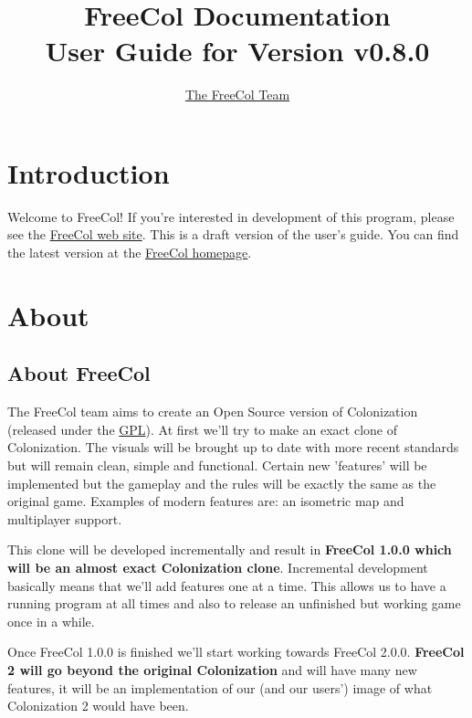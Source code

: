 \documentclass[12pt]{article}
\begin{document}
\author{\href{http://freecol.sourceforge.net/index.php?section=8}{The FreeCol Team}}
\title{FreeCol Documentation\\User Guide for Version v0.8.0}
\maketitle{}

\tableofcontents
\newpage


\hypertarget{Introduction}{\section{Introduction}}

Welcome to FreeCol! If you're interested in development of this
program, please see the \href{http://freecol.sourceforge.net}{FreeCol
web site}. This is a draft version of the user's guide. You can find
the latest version at the
\href{http://freecol.sourceforge.net}{FreeCol homepage}.


\hypertarget{About}{\section{About}}

\hypertarget{About FreeCol}{\subsection{About FreeCol}}

The FreeCol team aims to create an Open Source version of
Colonization (released under the
\href{http://www.gnu.org/licenses/gpl.html}{GPL}). At
first we'll try to make an exact clone of Colonization. The visuals
will be brought up to date with more recent standards but will remain
clean, simple and functional. Certain new 'features' will be
implemented but the gameplay and the rules will be exactly the same as
the original game. Examples of modern features are: an isometric map
and multiplayer support.

This clone will be developed incrementally and result in
\textbf{FreeCol 1.0.0 which will be an almost exact Colonization
clone}. Incremental development basically means that we'll add
features one at a time. This allows us to have a running program at
all times and also to release an unfinished but working game once in a
while.

Once FreeCol 1.0.0 is finished we'll start working towards FreeCol
2.0.0. \textbf{FreeCol 2 will go beyond the original Colonization} and
will have many new features, it will be an implementation of our (and
our users') image of what Colonization 2 would have been.
\end{document}
